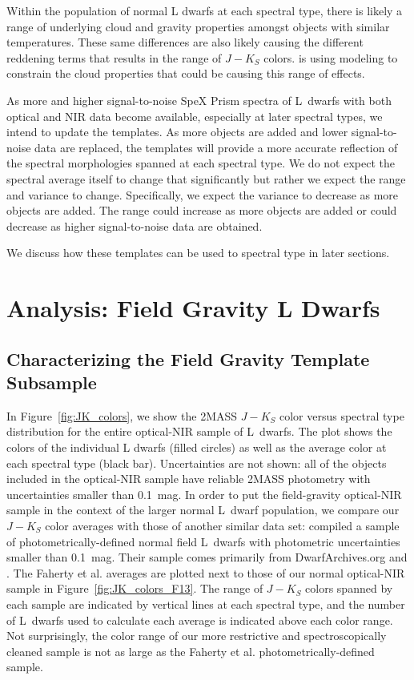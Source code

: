 \documentclass[12pt,preprint]{aastex}
\begin{document}
Within the population of normal L dwarfs at each spectral type, there is likely a range of underlying cloud and gravity properties amongst objects with similar temperatures.
These same differences are also likely causing the different reddening terms that results in the range of $J-K_S$ colors. \citet[in prep.]{Hiranaka13} is using modeling to constrain the cloud properties that could be causing this range of effects.

As more and higher signal-to-noise SpeX Prism spectra of L~dwarfs with both optical and NIR data become available, especially at later spectral types, we intend to update the templates. 
As more objects are added and lower signal-to-noise data are replaced, the templates will provide a more accurate reflection of the spectral morphologies spanned at each spectral type.
We do not expect the spectral average itself to change that significantly but rather we expect the range and variance to change. 
Specifically, we expect the variance to decrease as more objects are added. The range could increase as more objects are added or could decrease as higher signal-to-noise data are obtained.

We discuss how these templates can be used to spectral type in later sections.

\section{Analysis: Field Gravity L Dwarfs}
\label{sec:fieldg}

\subsection{Characterizing the Field Gravity Template Subsample}
\label{sec:templates_normal}
 
In Figure~\ref{fig:JK_colors}, we show the 2MASS $J-K_S$ color versus spectral type distribution for the entire optical-NIR sample of L~dwarfs. The plot shows the colors of the individual L dwarfs (filled circles) as well as the average color at each spectral type (black bar). Uncertainties are not shown: all of the objects included in the optical-NIR sample have reliable 2MASS photometry with uncertainties smaller than 0.1~mag. In order to put the field-gravity optical-NIR sample in the context of the larger normal L~dwarf population, we compare our $J-K_S$ color averages with those of another similar data set: \citet{Faherty13_0355} compiled a sample of photometrically-defined normal field L~dwarfs with photometric uncertainties smaller than 0.1~mag. Their sample comes primarily from DwarfArchives.org and \cite{Schmidt10}. The Faherty et al. averages are plotted next to those of our normal optical-NIR sample in Figure~\ref{fig:JK_colors_F13}. The range of $J-K_S$ colors spanned by each sample are indicated by vertical lines at each spectral type, and the number of L~dwarfs used to calculate each average is indicated above each color range. Not surprisingly, the color range of our more restrictive and spectroscopically cleaned sample is not as large as the Faherty et al. photometrically-defined sample. 
\end{document}
